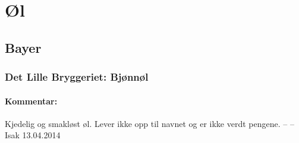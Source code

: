 \documentclass[12pt,a4paper,oneside,norsk]{article}
\begin{document}
    \thispagestyle{empty}
\newpage

\setcounter{page}{1}
\tableofcontents
\newpage

\section{Øl}
\subsection{Bayer}

\subsubsection{Det Lille Bryggeriet: Bjønnøl}
\paragraph{Kommentar:}Kjedelig og smakløst øl. Lever ikke opp til navnet og er ikke verdt pengene.
\newline
-- -- Isak 13.04.2014
\end{document}
